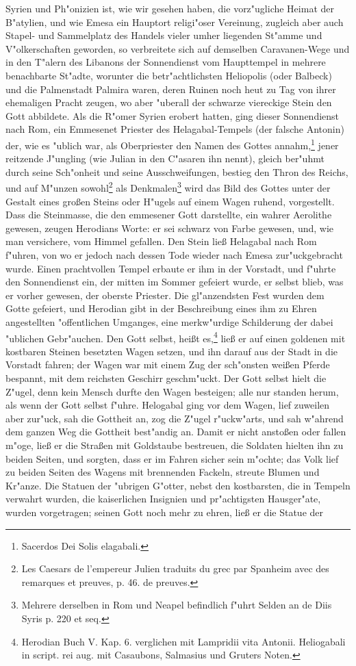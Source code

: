 \documentclass[a4paper, 11pt, oneside, polutonikogreek, german]{article}
\begin{document}
Syrien und Ph"onizien ist, wie wir gesehen haben, die vorz"ugliche Heimat der B"atylien, und wie Emesa ein Hauptort religi"oser Vereinung, zugleich aber auch Stapel- und Sammelplatz des Handels vieler umher liegenden St"amme und V"olkerschaften geworden, so verbreitete sich auf demselben Caravanen-Wege und in den T"alern des Libanons der Sonnendienst vom Haupttempel in mehrere benachbarte St"adte, worunter die betr"achtlichsten Heliopolis (oder Balbeck) und die Palmenstadt Palmira waren, deren Ruinen noch heut zu Tag von ihrer ehemaligen Pracht zeugen, wo aber "uberall der schwarze viereckige Stein den Gott abbildete. Als die R"omer Syrien erobert hatten, ging dieser Sonnendienst nach Rom, ein Emmesenet Priester des Helagabal-Tempels (der falsche Antonin) der, wie es "ublich war, als Oberpriester den Namen des Gottes annahm,\footnote{Sacerdos Dei Solis elagabali.} jener reitzende J"ungling (wie Julian in den C"asaren ihn nennt), gleich ber"uhmt durch seine Sch"onheit und seine Ausschweifungen, bestieg den Thron des Reichs, und auf M"unzen sowohl\footnote{Les Caesars de l'empereur Julien traduits du grec par Spanheim avec des remarques et preuves, p. 46. de preuves.} als Denkmalen\footnote{Mehrere derselben in Rom und Neapel befindlich f"uhrt Selden an de Diis Syris p. 220 et seq.} wird das Bild des Gottes unter der Gestalt eines großen Steins oder H"ugels auf einem Wagen ruhend, vorgestellt. Dass die Steinmasse, die den emmesener Gott darstellte, ein wahrer Aerolithe gewesen, zeugen Herodians Worte: er sei schwarz von Farbe gewesen, und, wie man versichere, vom Himmel gefallen. Den Stein ließ Helagabal nach Rom f"uhren, von wo er jedoch nach dessen Tode wieder nach Emesa zur"uckgebracht wurde. Einen prachtvollen Tempel erbaute er ihm in der Vorstadt, und f"uhrte den Sonnendienst ein, der mitten im Sommer gefeiert wurde, er selbst blieb, was er vorher gewesen, der oberste Priester. Die gl"anzendsten Fest wurden dem Gotte gefeiert, und Herodian gibt in der Beschreibung eines ihm zu Ehren angestellten "offentlichen Umganges, eine merkw"urdige Schilderung der dabei "ublichen Gebr"auchen. Den Gott selbst, heißt es,\footnote{Herodian Buch V. Kap. 6. verglichen mit Lampridii vita Antonii. Heliogabali in script. rei aug. mit Casaubons, Salmasius und Gruters Noten.} ließ er auf einen goldenen mit kostbaren Steinen besetzten Wagen setzen, und ihn darauf aus der Stadt in die Vorstadt fahren; der Wagen war mit einem Zug der sch"onsten weißen Pferde bespannt, mit dem reichsten Geschirr geschm"uckt. Der Gott selbst hielt die Z"ugel, denn kein Mensch durfte den Wagen besteigen; alle nur standen herum, als wenn der Gott selbst f"uhre. Helogabal ging vor dem Wagen, lief zuweilen aber zur"uck, sah die Gottheit an, zog die Z"ugel r"uckw"arts, und sah w"ahrend dem ganzen Weg die Gottheit best"andig an. Damit er nicht anstoßen oder fallen m"oge, ließ er die Straßen mit Goldstaube bestreuen, die Soldaten hielten ihn zu beiden Seiten, und sorgten, dass er im Fahren sicher sein m"ochte; das Volk lief zu beiden Seiten des Wagens mit brennenden Fackeln, streute Blumen und Kr"anze. Die Statuen der "ubrigen G"otter, nebst den kostbarsten, die in Tempeln verwahrt wurden, die kaiserlichen Insignien und pr"achtigsten Hausger"ate, wurden vorgetragen; seinen Gott noch mehr zu ehren, ließ er die Statue der 
\end{document}
